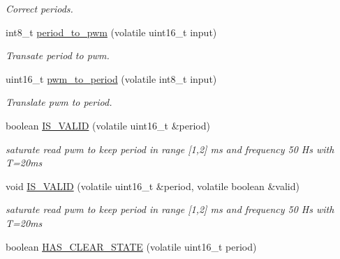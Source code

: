 \begin{DoxyCompactItemize}
\begin{DoxyCompactList}\small\item\em Correct periods. \end{DoxyCompactList}\item 
int8\+\_\+t \hyperlink{namespaceSPMB_1_1util_a79b8e16f207d7a06916905baa87afca3}{period\+\_\+to\+\_\+pwm} (volatile uint16\+\_\+t input)\hypertarget{namespaceSPMB_1_1util_a79b8e16f207d7a06916905baa87afca3}{}\label{namespaceSPMB_1_1util_a79b8e16f207d7a06916905baa87afca3}

\begin{DoxyCompactList}\small\item\em Transate period to pwm. \end{DoxyCompactList}\item 
uint16\+\_\+t \hyperlink{namespaceSPMB_1_1util_a59bd5fc051bb8e5601fb8bc0cefebf67}{pwm\+\_\+to\+\_\+period} (volatile int8\+\_\+t input)\hypertarget{namespaceSPMB_1_1util_a59bd5fc051bb8e5601fb8bc0cefebf67}{}\label{namespaceSPMB_1_1util_a59bd5fc051bb8e5601fb8bc0cefebf67}

\begin{DoxyCompactList}\small\item\em Translate pwm to period. \end{DoxyCompactList}\item 
boolean \hyperlink{namespaceSPMB_1_1util_aa7a7258bfb5e56987098fbd639059f7f}{I\+S\+\_\+\+V\+A\+L\+ID} (volatile uint16\+\_\+t \&period)\hypertarget{namespaceSPMB_1_1util_aa7a7258bfb5e56987098fbd639059f7f}{}\label{namespaceSPMB_1_1util_aa7a7258bfb5e56987098fbd639059f7f}

\begin{DoxyCompactList}\small\item\em saturate read pwm to keep period in range \mbox{[}1,2\mbox{]} ms and frequency 50 Hs with T=20ms \end{DoxyCompactList}\item 
void \hyperlink{namespaceSPMB_1_1util_a21b8f49acf2ab92e460320ad1b7e923c}{I\+S\+\_\+\+V\+A\+L\+ID} (volatile uint16\+\_\+t \&period, volatile boolean \&valid)\hypertarget{namespaceSPMB_1_1util_a21b8f49acf2ab92e460320ad1b7e923c}{}\label{namespaceSPMB_1_1util_a21b8f49acf2ab92e460320ad1b7e923c}

\begin{DoxyCompactList}\small\item\em saturate read pwm to keep period in range \mbox{[}1,2\mbox{]} ms and frequency 50 Hs with T=20ms \end{DoxyCompactList}\item 
boolean \hyperlink{namespaceSPMB_1_1util_a9602ed8ba5ebb3d4ef020c25d881f9c7}{H\+A\+S\+\_\+\+C\+L\+E\+A\+R\+\_\+\+S\+T\+A\+TE} (volatile uint16\+\_\+t period)\hypertarget{namespaceSPMB_1_1util_a9602ed8ba5ebb3d4ef020c25d881f9c7}{}\label{namespaceSPMB_1_1util_a9602ed8ba5ebb3d4ef020c25d881f9c7}


\end{DoxyCompactItemize}
